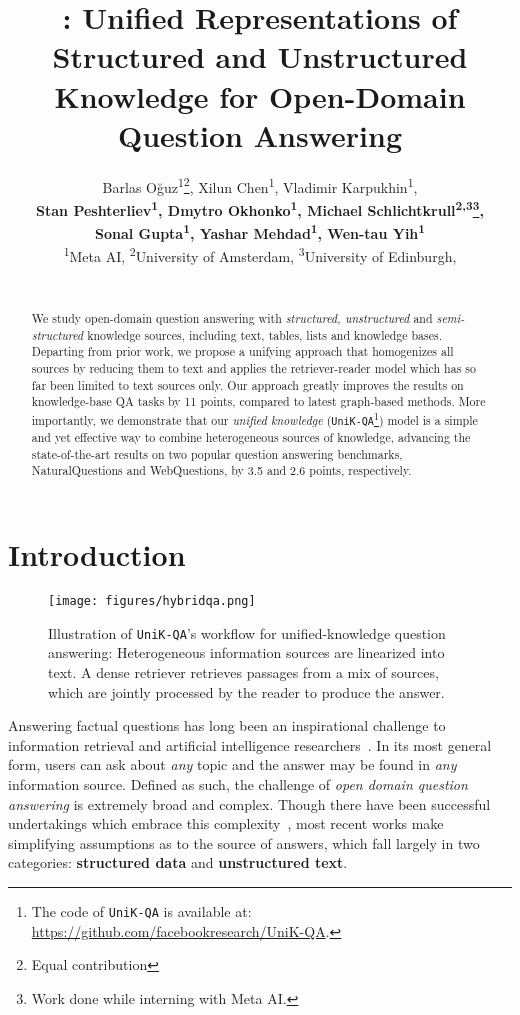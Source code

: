 \documentclass[11pt]{article}
\title{\uniqat: Unified Representations of Structured and Unstructured Knowledge for Open-Domain Question Answering}
\author{Barlas Oğuz\textsuperscript{1}\thanks{\hspace{.06in}Equal contribution}, Xilun Chen\textsuperscript{1}\samethanks, Vladimir Karpukhin\textsuperscript{1},\\ \textbf{Stan Peshterliev\textsuperscript{1}, Dmytro Okhonko\textsuperscript{1}, Michael Schlichtkrull\textsuperscript{2,3}\thanks{\hspace{.06in}Work done while interning with Meta AI.},} \\ \textbf{Sonal Gupta\textsuperscript{1},  Yashar Mehdad\textsuperscript{1}, Wen-tau Yih\textsuperscript{1}} \\
\textsuperscript{1}Meta AI,
\textsuperscript{2}University of Amsterdam,
\textsuperscript{3}University of Edinburgh,\\
\scalebox{0.9}{{\tt \{barlaso,xilun,stanvp,sonalgupta,mehdad,scottyih\}@fb.com}}\\
\scalebox{0.87}{{\tt vlad.karpuhin@gmail.com, d.okhonko@gmail.com, m.s.schlichtkrull@uva.nl}}}
\date{}
\newcommand{\uniqa}{\texttt{UniK-QA}\xspace}
\begin{document}
\maketitle
\begin{abstract}
We study open-domain question answering with \emph{structured, unstructured} and \emph{semi-structured} knowledge sources, including text, tables, lists and knowledge bases.  
Departing from prior work, we propose a unifying approach that homogenizes all sources by reducing them to text and applies the retriever-reader model which has so far been limited to text sources only.
Our approach greatly improves the results on knowledge-base QA tasks by 11 points, compared to latest graph-based methods.
More importantly, we demonstrate that our \emph{unified knowledge} (\uniqa{}\footnote{The code of \uniqa{} is available at: \url{https://github.com/facebookresearch/UniK-QA}.}) model is a simple and yet effective way to combine heterogeneous sources of knowledge, advancing the state-of-the-art results on two popular question answering benchmarks, NaturalQuestions and WebQuestions, by 3.5 and 2.6 points, respectively.
 \end{abstract}


\section{Introduction}

\begin{figure}[t!]
\texttt{[image: figures/hybridqa.png]}
\caption{Illustration of \uniqa{}'s workflow for unified-knowledge question answering: Heterogeneous information sources are linearized into text. A dense retriever retrieves passages from a mix of sources, which are jointly processed by the reader to produce the answer.}
\centering
\label{fig:hybridqa}
\vspace{-3mm}
\end{figure}

Answering factual questions has long been an inspirational challenge to information retrieval and artificial intelligence researchers~\cite{voorhees-tice-2000-trec,lopez2011question}.
In its most general form, users can ask about \emph{any} topic and the answer may be found in \emph{any} information source.  
Defined as such, the challenge of \emph{open domain question answering} is extremely broad and complex.
Though there have been successful undertakings which embrace this complexity~\citep[notably][]{ferrucci2012introduction}, most recent works make simplifying assumptions as to the source of answers, which
fall largely in two categories: \textbf{structured data} and \textbf{unstructured text}.  
\end{document}

